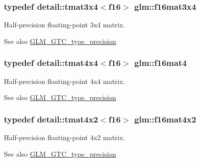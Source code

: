 \subsubsection[{f16mat3x4}]{\setlength{\rightskip}{0pt plus 5cm}typedef detail\+::tmat3x4$<$f16$>$ {\bf glm\+::f16mat3x4}}\label{group__gtc__type__precision_gaebfd661385fe915a713b91654169a455}
Half-\/precision floating-\/point 3x4 matrix. \begin{DoxySeeAlso}{See also}
\hyperlink{group__gtc__type__precision}{G\+L\+M\+\_\+\+G\+T\+C\+\_\+type\+\_\+precision} 
\end{DoxySeeAlso}
\hypertarget{group__gtc__type__precision_gab8417233c8f428e6e46bf77c7fc11200}{}
\subsubsection[{f16mat4}]{\setlength{\rightskip}{0pt plus 5cm}typedef detail\+::tmat4x4$<$f16$>$ {\bf glm\+::f16mat4}}\label{group__gtc__type__precision_gab8417233c8f428e6e46bf77c7fc11200}
Half-\/precision floating-\/point 4x4 matrix. \begin{DoxySeeAlso}{See also}
\hyperlink{group__gtc__type__precision}{G\+L\+M\+\_\+\+G\+T\+C\+\_\+type\+\_\+precision} 
\end{DoxySeeAlso}
\hypertarget{group__gtc__type__precision_ga1f933a7c0b489807dc22537b80f2e5f2}{}
\subsubsection[{f16mat4x2}]{\setlength{\rightskip}{0pt plus 5cm}typedef detail\+::tmat4x2$<$f16$>$ {\bf glm\+::f16mat4x2}}\label{group__gtc__type__precision_ga1f933a7c0b489807dc22537b80f2e5f2}
Half-\/precision floating-\/point 4x2 matrix. \begin{DoxySeeAlso}{See also}
\hyperlink{group__gtc__type__precision}{G\+L\+M\+\_\+\+G\+T\+C\+\_\+type\+\_\+precision} 
\end{DoxySeeAlso}
\hypertarget{group__gtc__type__precision_gaa0c9c69c19bf90bb73e455a1e61f7114}{}

